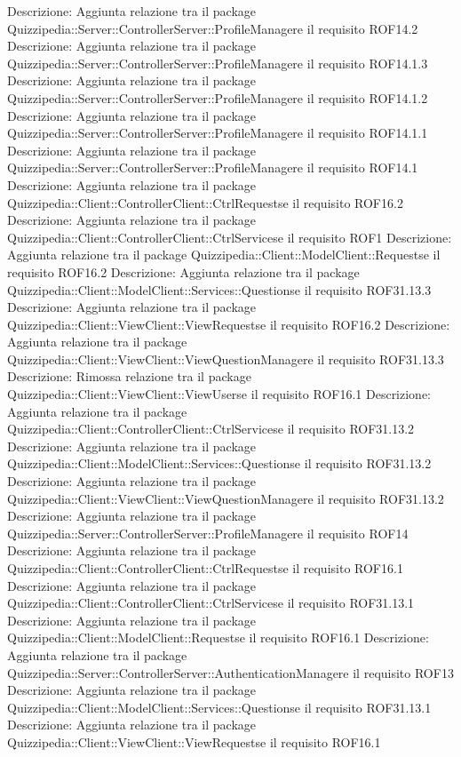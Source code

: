 Descrizione: Aggiunta relazione tra il package Quizzipedia::Server::ControllerServer::ProfileManagere il requisito ROF14.2 
Descrizione: Aggiunta relazione tra il package Quizzipedia::Server::ControllerServer::ProfileManagere il requisito ROF14.1.3 
Descrizione: Aggiunta relazione tra il package Quizzipedia::Server::ControllerServer::ProfileManagere il requisito ROF14.1.2 
Descrizione: Aggiunta relazione tra il package Quizzipedia::Server::ControllerServer::ProfileManagere il requisito ROF14.1.1 
Descrizione: Aggiunta relazione tra il package Quizzipedia::Server::ControllerServer::ProfileManagere il requisito ROF14.1 
Descrizione: Aggiunta relazione tra il package Quizzipedia::Client::ControllerClient::CtrlRequestse il requisito ROF16.2 
Descrizione: Aggiunta relazione tra il package Quizzipedia::Client::ControllerClient::CtrlServicese il requisito ROF1 
Descrizione: Aggiunta relazione tra il package Quizzipedia::Client::ModelClient::Requestse il requisito ROF16.2 
Descrizione: Aggiunta relazione tra il package Quizzipedia::Client::ModelClient::Services::Questionse il requisito ROF31.13.3 
Descrizione: Aggiunta relazione tra il package Quizzipedia::Client::ViewClient::ViewRequestse il requisito ROF16.2 
Descrizione: Aggiunta relazione tra il package Quizzipedia::Client::ViewClient::ViewQuestionManagere il requisito ROF31.13.3 
Descrizione: Rimossa relazione tra il package Quizzipedia::Client::ViewClient::ViewUserse il requisito ROF16.1 
Descrizione: Aggiunta relazione tra il package Quizzipedia::Client::ControllerClient::CtrlServicese il requisito ROF31.13.2 
Descrizione: Aggiunta relazione tra il package Quizzipedia::Client::ModelClient::Services::Questionse il requisito ROF31.13.2 
Descrizione: Aggiunta relazione tra il package Quizzipedia::Client::ViewClient::ViewQuestionManagere il requisito ROF31.13.2 
Descrizione: Aggiunta relazione tra il package Quizzipedia::Server::ControllerServer::ProfileManagere il requisito ROF14 
Descrizione: Aggiunta relazione tra il package Quizzipedia::Client::ControllerClient::CtrlRequestse il requisito ROF16.1 
Descrizione: Aggiunta relazione tra il package Quizzipedia::Client::ControllerClient::CtrlServicese il requisito ROF31.13.1 
Descrizione: Aggiunta relazione tra il package Quizzipedia::Client::ModelClient::Requestse il requisito ROF16.1 
Descrizione: Aggiunta relazione tra il package Quizzipedia::Server::ControllerServer::AuthenticationManagere il requisito ROF13 
Descrizione: Aggiunta relazione tra il package Quizzipedia::Client::ModelClient::Services::Questionse il requisito ROF31.13.1 
Descrizione: Aggiunta relazione tra il package Quizzipedia::Client::ViewClient::ViewRequestse il requisito ROF16.1 

